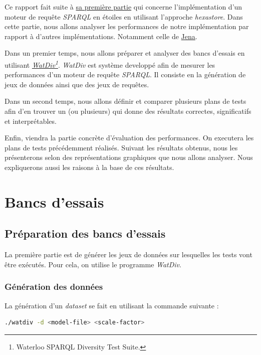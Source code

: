\documentclass[12pt,titlepage]{article}
\begin{document}
Ce rapport fait suite à \href{https://github.com/chakibreds/mtq\_moteur\_sparql}{sa première partie} qui concerne l'implémentation d'un moteur de requête \textit{SPARQL} en étoiles en utilisant l'approche \textit{hexastore}. Dans cette partie, nous allons analyser les performances de notre implémentation par rapport à d'autres implémentations. Notamment celle de \href{https://fr.wikipedia.org/wiki/Jena\_(framework)}{Jena}.

Dans un premier temps, nous allons préparer et analyser des bancs d'essais en utilisant \textit{\href{https://dsg.uwaterloo.ca/watdiv/}{WatDiv}\footnote{Waterloo SPARQL Diversity Test Suite.}}. \textit{WatDiv} est système developpé afin de mesurer les performances d'un moteur de requête \textit{SPARQL}. Il consiste en la génération de jeux de données ainsi que des jeux de requêtes.

Dans un second temps, nous allons définir et comparer plusieurs plans de tests afin d'en trouver un (ou plusieurs) qui donne des résultats correctes, significatifs et interprétables.

Enfin, viendra la partie concrète d'évaluation des performances. On executera les plans de tests précédemment réalisés. Suivant les résultats obtenus, nous les présenterons selon des représentations graphiques que nous allons analyser. Nous expliquerons aussi les raisons à la base de ces résultats.

\section{Bancs d'essais}

\subsection{Préparation des bancs d'essais}

La première partie est de générer les jeux de données sur lesquelles les tests vont être exécutés. Pour cela, on utilise le programme \textit{WatDiv}.

\subsubsection{Génération des données}

La génération d'un \textit{dataset} se fait en utilisant la commande suivante :

\begin{lstlisting}[language=bash,caption=Commande pour la création  d'un dataset]
  ./watdiv -d <model-file> <scale-factor>
\end{lstlisting}
\end{document}
